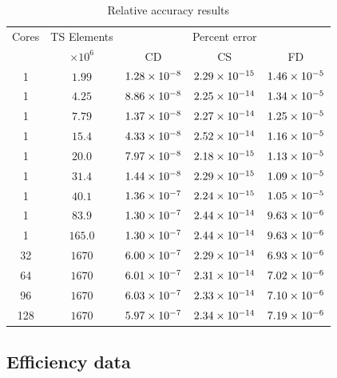 \documentclass[preprint,12pt]{elsarticle}
\begin{document}
\begin{table}[!ht]    
  \scriptsize
  \centering
        \caption{Relative accuracy results} \label{tab:RelAcc}   
       \begin{tabular}{c c c c c}
         \toprule
         Cores & TS Elements & \multicolumn{3}{c}{Percent error} \\ 
         & $\times 10^6$ & CD & CS & FD \\
        \midrule
        1 & $\num{1.99}$ &  $\num{1.28E-8}$ &  $\num{2.29E-15}$ &  $\num{1.46E-5}$ \\
        1 & $\num{4.25}$ &  $\num{8.86E-8}$ &  $\num{2.25E-14}$ &  $\num{1.34E-5}$ \\
        1 & $\num{7.79}$ &  $\num{1.37E-8}$ &  $\num{2.27E-14}$ &  $\num{1.25E-5}$ \\
        1 & $\num{15.4}$ &  $\num{4.33E-8}$ &  $\num{2.52E-14}$ &  $\num{1.16E-5}$ \\
        1 & $\num{20.0}$ &  $\num{7.97E-8}$ &  $\num{2.18E-15}$ &  $\num{1.13E-5}$ \\
        1 & $\num{31.4}$ &  $\num{1.44E-8}$ &  $\num{2.29E-15}$ &  $\num{1.09E-5}$ \\
        1 & $\num{40.1}$ &  $\num{1.36E-7}$ &  $\num{2.24E-15}$ &  $\num{1.05E-5}$ \\
        1 & $\num{83.9}$ &  $\num{1.30E-7}$ &  $\num{2.44E-14}$ &  $\num{9.63E-6}$ \\
        1 & $\num{165.0}$ &  $\num{1.30E-7}$ &  $\num{2.44E-14}$ &  $\num{9.63E-6}$ \\
        32 & $\num{1670}$ &  $\num{6.00E-7}$ &  $\num{2.29E-14}$ &  $\num{6.93E-6}$ \\
        64 & $\num{1670}$ &  $\num{6.01E-7}$ &  $\num{2.31E-14}$ &  $\num{7.02E-6}$ \\
        96 & $\num{1670}$ &  $\num{6.03E-7}$ &  $\num{2.33E-14}$ &  $\num{7.10E-6}$ \\
        128 & $\num{1670}$ &  $\num{5.97E-7}$ &  $\num{2.34E-14}$ &  $\num{7.19E-6}$ \\
        \bottomrule
    \end{tabular}
\end{table}

\subsection{Efficiency data}
\end{document}
